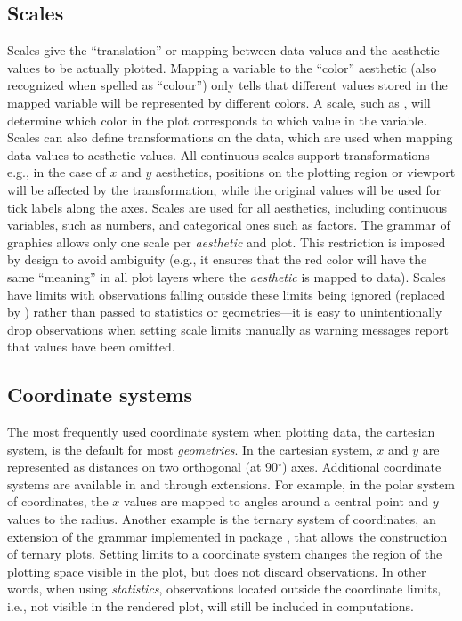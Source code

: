 \documentclass[krantz2]{krantz}\usepackage{knitr}
\begin{document}
\subsection{Scales}

Scales give the ``translation'' or mapping between data values and the aesthetic values to be actually plotted. Mapping a variable to the ``color'' aesthetic (also recognized when spelled as ``colour'') only tells that different values stored in the mapped variable will be represented by different colors. A scale, such as , will determine which color in the plot corresponds to which value in the variable. Scales can also define transformations on the data, which are used when mapping data values to aesthetic values. All continuous scales support transformations---e.g., in the case of $x$ and $y$ aesthetics, positions on the plotting region or viewport will be affected by the transformation, while the original values will be used for tick labels along the axes.  Scales are used for all aesthetics, including continuous variables, such as numbers, and categorical ones such as factors. The grammar of graphics allows only one scale per \emph{aesthetic} and plot. This restriction is imposed by design to avoid ambiguity (e.g., it ensures that the red color will have the same ``meaning'' in all plot layers where the  \emph{aesthetic} is mapped to data). Scales have limits with observations falling outside these limits being ignored (replaced by ) rather than passed to statistics or geometries---it is easy to unintentionally drop observations when setting scale limits manually as warning messages report that  values have been omitted.

\subsection{Coordinate systems}

The most frequently used coordinate system when plotting data, the cartesian system, is the default for most \emph{geometries}. In the cartesian system, $x$ and $y$ are represented as distances on two orthogonal (at 90$^\circ$) axes. Additional coordinate systems are available in  and through extensions. For example, in the polar system of coordinates, the $x$ values are mapped to angles around a central point and $y$ values to the radius. Another example is the ternary system of coordinates, an extension of the grammar implemented in package , that allows the construction of ternary plots. Setting limits to a coordinate system changes the region of the plotting space visible in the plot, but does not discard observations. In other words, when using \emph{statistics}, observations located outside the coordinate limits, i.e., not visible in the rendered plot, will still be included in computations.
\end{document}
